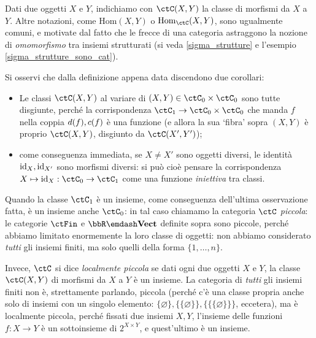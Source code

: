 \begin{notation}
	Dati due oggetti \(X\) e \(Y\), indichiamo con \(\Hom{\ctC}(X,Y)\) la classe di morfismi da \(X\) a \(Y\). Altre notazioni, come \(\mathrm{Hom}(X,Y)\) o \(\mathrm{Hom}_\ctC(X,Y)\), sono ugualmente comuni, e motivate dal fatto che le frecce di una categoria astraggono la nozione di \emph{omomorfismo} tra insiemi strutturati (si veda \autoref{sigma_strutture} e l'esempio \autoref{sigma_strutture_sono_cat}).
\end{notation}
\begin{remark}
	Si osservi che dalla definizione appena data discendono due corollari:
	\begin{itemize}
		\item Le classi \(\Hom{\ctC}(X,Y)\) al variare di \((X,Y)\in\ctC_0\times\ctC_0\) sono tutte disgiunte, perché la corrispondenza \(\ctC_1 \to \ctC_0\times\ctC_0\) che manda \(f\) nella coppia \(d(f),c(f)\) è una funzione (e allora la sua `fibra' sopra \((X,Y)\) è proprio \(\Hom{\ctC}(X,Y)\), disgiunto da \(\Hom{\ctC}(X',Y')\));
		\item come conseguenza immediata, se \(X\ne X'\) sono oggetti diversi, le identità \(\mathrm{id}_X,\mathrm{id}_{X'}\) sono morfismi diversi: si può cioè pensare la corrispondenza \(X\mapsto \id_X : \ctC_0\to\ctC_1\) come una funzione \emph{iniettiva} tra classi.
	\end{itemize}
\end{remark}
\begin{definition}
	Quando la classe \(\ctC_1\) è un insieme, come conseguenza dell'ultima osservazione fatta, è un insieme anche \(\ctC_0\): in tal caso chiamamo la categoria \(\ctC\) \emph{piccola}: le categorie \(\ctFin\) e \(\bbR\emdash\ctVect\) definite sopra sono piccole, perché abbiamo limitato enormemente la loro classe di oggetti: non abbiamo considerato \emph{tutti} gli insiemi finiti, ma solo quelli della forma \(\{1,\dots,n\}\).

	Invece, \(\ctC\) si dice \emph{localmente piccola} se dati ogni due oggetti \(X\) e \(Y\), la classe \(\Hom{\ctC}(X,Y)\) di morfismi da \(X\) a \(Y\) è un insieme. La categoria di \emph{tutti} gli insiemi finiti non è, strettamente parlando, piccola (perché c'è una classe propria anche solo di insiemi con un singolo elemento: \(\{\varnothing\},\{\{\varnothing\}\}, \{\{\{\varnothing\}\}\}\), eccetera), ma è localmente piccola, perché fissati due insiemi \(X,Y\), l'insieme delle funzioni \(f : X\to Y\) è un sottoinsieme di \(2^{X\times Y}\), e quest'ultimo è un insieme.
\end{definition}
